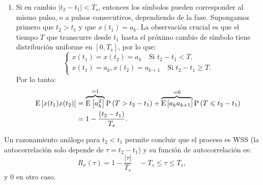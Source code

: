 \begin{ejemplo}
\begin{enumerate}
        \item Si en cambio $|t_2-t_1|<T_s$, entonces los símbolos pueden corresponder al mismo pulso, o a pulsos consecutivos, dependiendo de la fase. Supongamos primero que $t_2>t_1$ y que $x(t_1)=a_k$. La observación crucial es que el tiempo $T$ que transcurre desde $t_1$ hasta el próximo cambio de símbolo tiene distribución uniforme en $[0,T_s]$, por lo que:
        \begin{equation*}
            \begin{cases}
            x(t_1) = x(t_2) = a_k \quad  \text{Si } t_2-t_1 < T, \\
            x(t_1) = a_k, x(t_2) = a_{k+1} \quad  \text{Si } t_2-t_1 \geqslant T.
            \end{cases}
        \end{equation*}
        Por lo tanto:
        \begin{align*}
            \mathrm{E}\left[x(t_1)x(t_2)\right] &= \overbrace{\mathrm{E}\left[a_k^2\right]}^{=1} \mathrm{P}\left(T>t_2-t_1\right) + \overbrace{\mathrm{E}\left[a_ka_{k+1}\right]}^{=0}\mathrm{P}\left(T\leqslant t_2-t_1\right) \\
            &= 1-\frac{(t_2-t_1)}{T_s}. 
        \end{align*}
    \end{enumerate}

    Un razonamiento análogo para $t_2<t_1$ permite concluir que el proceso es WSS (la autocorrelación solo depende de $\tau=t_2-t_1$) y su función de autocorrelación es:
    \begin{equation}\label{eq:autocorrelacion onda binaria centrada}
        R_x(\tau) = 1-\frac{|\tau|}{T_s} \quad -T_s\leqslant \tau \leqslant T_s,
    \end{equation}
    y $0$ en otro caso.

    \begin{center}
    \end{center}
\end{ejemplo}

